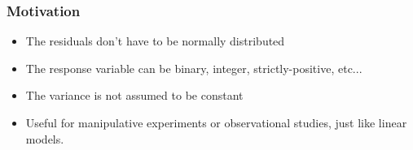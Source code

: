 \documentclass[color=usenames,dvipsnames]{beamer}\usepackage[]{graphicx}\usepackage[]{color}
\begin{document}
\begin{frame}
  \frametitle{Motivation}
  \large
  \begin{itemize}%
    \item<2-> The residuals don't have to be normally distributed
    \item<3-> The response variable can be binary, integer,
      strictly-positive, etc...
    \item<4-> The variance is not assumed to be constant
    \item<5-> Useful for manipulative experiments or observational
      studies, just like linear models.
  \end{itemize}
  \vfill
\end{frame}
\end{document}
